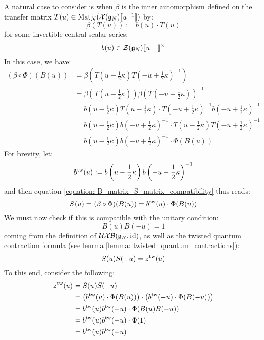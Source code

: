             A natural case to consider is when $\beta$ is the inner automorphism defined on the transfer matrix $T(u) \in \mathrm{Mat}_N( \mathcal{X}(\mathfrak{g}_N)[\![u^{-1}]\!] )$ by:
                $$\beta( T(u) ) := b(u) \cdot T(u)$$
            for some invertible central scalar series:
                $$b(u) \in \calZ(\g_N)[\![u^{-1}]\!]^{\x}$$
            In this case, we have:
                $$
                    \begin{aligned}
                        (\beta \circ \Phi)( B(u) ) & = \beta\left( T\left(u - \frac12 \kappa\right) T\left(-u + \frac12 \kappa\right)^{-1} \right)
                        \\
                        & = \beta\left( T\left(u - \frac12 \kappa\right) \right) \beta\left( T\left(-u + \frac12 \kappa\right) \right)^{-1}
                        \\
                        & = b\left(u - \frac12 \kappa\right) T\left(u - \frac12 \kappa\right) \cdot T\left(-u + \frac12 \kappa\right)^{-1} b\left(-u + \frac12 \kappa\right)^{-1}
                        \\
                        & = b\left(u - \frac12 \kappa\right) b\left(-u + \frac12 \kappa\right)^{-1} \cdot T\left(u - \frac12 \kappa\right) T\left(-u + \frac12 \kappa\right)^{-1}
                        \\
                        & = b\left(u - \frac12 \kappa\right) b\left(-u + \frac12 \kappa\right)^{-1} \cdot \Phi( B(u) )
                    \end{aligned}
                $$
            For brevity, let:
                $$b^{\mathrm{tw}}(u) := b\left(u - \frac12 \kappa\right) b\left(-u + \frac12 \kappa\right)^{-1}$$
            and then equation \eqref{equation: B_matrix_S_matrix_compatibility} thus reads:
                $$S(u) = (\beta \circ \Phi)( B(u) ) = b^{\mathrm{tw}}(u) \cdot \Phi( B(u) )$$
            We must now check if this is compatible with the unitary condition:
                $$B(u) B(-u) = 1$$
            coming from the definition of $\mathcal{UXB}(\mathfrak{g}_N, \mathrm{id})$, as well as the twisted quantum contraction formula (see lemma \ref{lemma: twisted_quantum_contractions}):
                $$S(u) S(-u) = z^{\mathrm{tw}}(u)$$
            To this end, consider the following:
                $$
                    \begin{aligned}
                        z^{\mathrm{tw}}(u) & = S(u) S(-u)
                        \\
                        & = \left( b^{\mathrm{tw}}(u) \cdot \Phi( B(u) ) \right) \cdot \left( b^{\mathrm{tw}}(-u) \cdot \Phi( B(-u) ) \right)
                        \\
                        & = b^{\mathrm{tw}}(u) b^{\mathrm{tw}}(-u) \cdot \Phi( B(u) B(-u) )
                        \\
                        & = b^{\mathrm{tw}}(u) b^{\mathrm{tw}}(-u) \cdot \Phi(1)
                        \\
                        & = b^{\mathrm{tw}}(u) b^{\mathrm{tw}}(-u)
                    \end{aligned}
                $$
